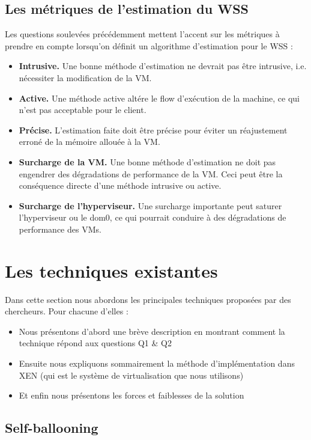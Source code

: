\subsection{Les métriques de l'estimation du WSS}
Les questions soulevées précédemment mettent l'accent sur les métriques à prendre en compte lorsqu'on définit un algorithme d'estimation pour le WSS :
\begin{itemize}[label=, font=\large]
    \item \textbf{Intrusive.} Une bonne méthode d'estimation ne devrait pas être intrusive, i.e. nécessiter la modification de la VM.
    \item \textbf{Active.} Une méthode active altére le flow d'exécution de la machine, ce qui n'est pas acceptable pour le client.
    \item \textbf{Précise.} L'estimation faite doit être précise pour éviter un réajustement erroné de la mémoire allouée à la VM.
    \item \textbf{Surcharge de la VM.} Une bonne méthode d'estimation ne doit pas engendrer des dégradations de performance de la VM. Ceci peut être la conséquence directe d'une méthode intrusive ou active.
    \item \textbf{Surcharge de l'hyperviseur.} Une surcharge importante peut saturer l'hyperviseur ou le dom0, ce qui pourrait conduire à des dégradations de performance des VMs.
\end{itemize}

\section{Les techniques existantes}
Dans cette section nous abordons les principales techniques proposées par des chercheurs. Pour chacune d'elles :
\begin{itemize}
    \item Nous présentons d'abord une brève description en montrant comment la technique répond aux questions Q1 \& Q2
    \item Ensuite nous expliquons sommairement la méthode d'implémentation dans XEN (qui est le système de virtualisation que nous utilisons)
    \item Et enfin nous présentons les forces et faiblesses de la solution
\end{itemize}  

\subsection{Self-ballooning}

